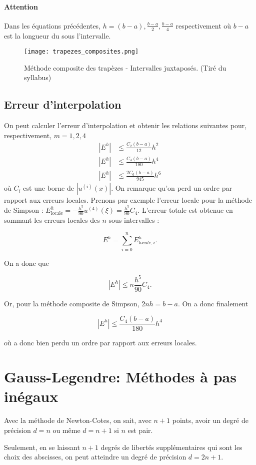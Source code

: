 \paragraph{Attention}
Dans les équations précédentes, $h = (b-a), \frac{b-a}{2}, \frac{b-a}{4}$
respectivement où $b-a$ est la longueur du sous l'intervalle.

\begin{figure}[ht]
	\centering
	\texttt{[image: trapezes\_composites.png]}
	\caption{Méthode composite des trapèzes - Intervalles juxtaposés.
	(Tiré du syllabus)}
	\label{fig:trapeze-composite}
\end{figure}

\subsection{Erreur d'interpolation}
On peut calculer l'erreur d'interpolation et obtenir les relations suivantes
pour, respectivement, $m = 1, 2, 4$
\begin{align*}
  |E^h| & \leq \frac{C_2(b-a)}{12}h^2\\
  |E^h| & \leq \frac{C_4(b-a)}{180}h^4\\
  |E^h| & \leq \frac{2C_6(b-a)}{945}h^6
\end{align*}
où $C_i$ est une borne de $|u^{(i)}(x)|$. On remarque qu'on perd un ordre
par rapport aux erreurs locales. Prenons par exemple l'erreur locale pour
la méthode de Simpson : $E^h_\text{locale} = -\frac{h^5}{90}u^{(4)}(\xi) 
= \frac{h^5}{90}C_4$. L'erreur totale est obtenue en sommant les erreurs locales
des $n$ sous-intervalles :

$$E^h = \sum_{i=0}^n E^h_{locale, i}.$$

On a donc que

$$|E^h| \leq n\frac{h^5}{90}C_4.$$

Or, pour la méthode composite de Simpson, $2nh = b-a$. On a donc finalement

$$|E^h| \leq \frac{C_4(b-a)}{180}h^4$$

où a donc bien perdu un ordre par rapport aux erreurs locales.

\section{Gauss-Legendre: Méthodes à pas inégaux}
Avec la méthode de Newton-Cotes, on sait, avec $n+1$ points, avoir
un degré de précision $d = n$ ou même $d = n+1$ si $n$ est pair.

Seulement, en se laissant $n+1$ degrés de libertés supplémentaires
qui sont les choix des abscisses, on peut atteindre
un degré de précision $d = 2n+1$.

